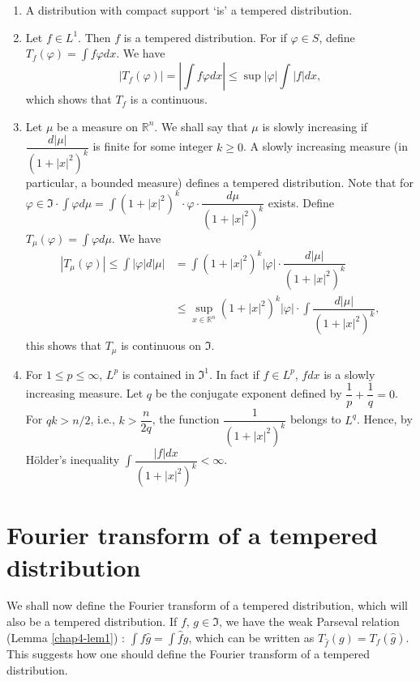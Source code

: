 \begin{examples*}
\begin{enumerate}
\renewcommand{\labelenumi}{(\theenumi)}
\item A distribution with compact support `is' a tempered
  distribution.

\item Let $f\in L^{1}$. Then $f$ is a tempered distribution. For if
  $\varphi\in S$, define $T_{f}(\varphi)=\int f\varphi dx$. We have
$$
|T_{f}(\varphi)|=\left| \int f\varphi dx\right|\leq \sup |\varphi|\int
|f| dx,
$$
which shows that $T_{f}$ is a continuous.

\item Let $\mu$ be a measure on $\mathbb{R}^{n}$. We shall say that
  $\mu$ is slowly increasing if $\dfrac{d|\mu|}{(1+|x|^{2})^{k}}$ is
  finite for some integer $k\geq 0$. A slowly increasing measure (in
  particular, a bounded measure) defines a tempered distribution. Note
  that for $\varphi \in \mathfrak{I}\cdot \int \varphi d\mu =\int
  (1+|x|^{2})^{k}\cdot \varphi\cdot \dfrac{d\mu}{(1+|x|^{2})^{k}}$
  exists. Define $T_{\mu}(\varphi)=\int \varphi d\mu$. We have
\begin{align*}
|T_{\mu}(\varphi)|\leq \int |\varphi|d|\mu| &= \int
(1+|x|^{2})^{k}|\varphi|\cdot \dfrac{d|\mu|}{(1+|x|^{2})^{k}}\\[4pt]
&\leq \sup\limits_{x\in \mathbb{R}^{n}}(1+|x|^{2})^{k}|\varphi|\cdot
\int \dfrac{d|\mu|}{(1+|x|^{2})^{k}},
\end{align*}
this shows that $T_{\mu}$ is continuous on $\mathfrak{I}$.

\item For $1\leq p\leq \infty$, $L^{p}$ is contained in
  $\mathfrak{I}^{1}$. In fact if $f\in L^{p}$, $fdx$ is\pageoriginale
  a slowly increasing measure. Let $q$ be the conjugate exponent
  defined by $\dfrac{1}{p}+\dfrac{1}{q}=0$. For $qk>n/2$, i.e.,
  $k>\dfrac{n}{2q}$, the function $\dfrac{1}{(1+|x|^{2})^{k}}$ belongs
  to $L^{q}$. Hence, by H\"older's inequality $\int \dfrac{|f|dx}{(1+|x|^{2})^{k}}<\infty$.
\end{enumerate}
\end{examples*}

\section*{Fourier transform of a tempered distribution}

We shall now define the Fourier transform of a tempered distribution,
which will also be a tempered distribution. If $f$, $g\in
\mathfrak{I}$, we have the weak Parseval relation (Lemma
\ref{chap4-lem1}) : $\int f\widehat{g}=\int \widehat{f}g$, which can
be written as $T_{\widehat{f}}(g)=T_{f}(\widehat{g})$. This suggests
how one should define the Fourier transform of a tempered
distribution.

